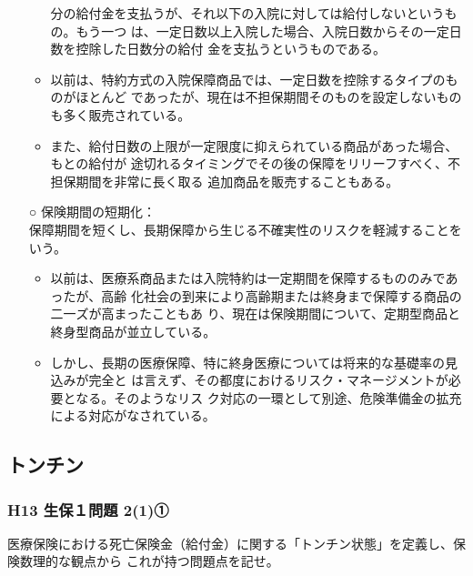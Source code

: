\documentclass[report,gutter=10mm,fore-edge=10mm,uplatex,dvipdfmx]{jlreq}
\begin{document}
\begin{itemize}
\begin{itemize}
 分の給付金を支払うが、それ以下の入院に対しては給付しないというもの。もう一つ
 は、一定日数以上入院した場合、入院日数からその一定日数を控除した日数分の給付
 金を支払うというものである。
 \item 以前は、特約方式の入院保障商品では、一定日数を控除するタイプのものがほとんど
 であったが、現在は不担保期間そのものを設定しないものも多く販売されている。
 \item また、給付日数の上限が一定限度に抑えられている商品があった場合、もとの給付が
 途切れるタイミングでその後の保障をリリーフすべく、不担保期間を非常に長く取る
 追加商品を販売することもある。
\end{itemize}
 \item [○] 保険期間の短期化：\\
 保障期間を短くし、長期保障から生じる不確実性のリスクを軽減することをいう。
\begin{itemize}
 \item 以前は、医療系商品または入院特約は一定期間を保障するもののみであったが、高齢
 化社会の到来により高齢期または終身まで保障する商品の二一ズが高まったこともあ
 り、現在は保険期間について、定期型商品と終身型商品が並立している。
 \item しかし、長期の医療保障、特に終身医療については将来的な基礎率の見込みが完全と
 は言えず、その都度におけるリスク・マネージメントが必要となる。そのようなリス
 ク対応の一環として別途、危険準備金の拡充による対応がなされている。
\end{itemize}
\end{itemize}
\subsection{トンチン}
\subsubsection{H13 生保１問題 2(1)①}
医療保険における死亡保険金（給付金）に関する「トンチン状態」を定義し、保険数理的な観点から
これが持つ問題点を記せ。
\end{document}
